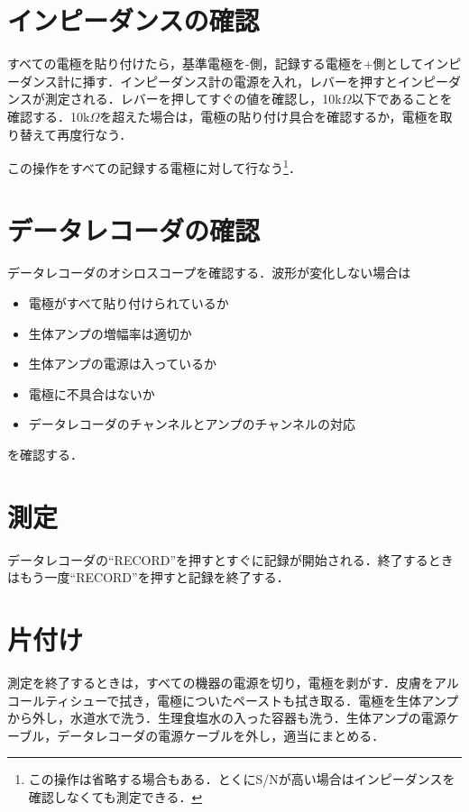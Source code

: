 \documentclass[a4j, twocolumn, openleft, uplatex, dvipdfmx]{jsbook}
\begin{document}
        \section{インピーダンスの確認}
        \label{sec:インピーダンスの確認}

            すべての電極を貼り付けたら，基準電極を-側，記録する電極を+側としてインピーダンス計に挿す．インピーダンス計の電源を入れ，レバーを押すとインピーダンスが測定される．レバーを押してすぐの値を確認し，10k$\Omega$以下であることを確認する．10k$\Omega$を超えた場合は，電極の貼り付け具合を確認するか，電極を取り替えて再度行なう．

            この操作をすべての記録する電極に対して行なう\footnote{この操作は省略する場合もある．とくにS/Nが高い場合はインピーダンスを確認しなくても測定できる．}．

        \section{データレコーダの確認}
        \label{sec:データレコーダの確認}

            データレコーダのオシロスコープを確認する．波形が変化しない場合は
            \begin{itemize}
                \item 電極がすべて貼り付けられているか
                \item 生体アンプの増幅率は適切か
                \item 生体アンプの電源は入っているか
                \item 電極に不具合はないか
                \item データレコーダのチャンネルとアンプのチャンネルの対応
            \end{itemize}
            を確認する．

        \section{測定}
        \label{sec:測定}

            データレコーダの``\textsf{RECORD}''を押すとすぐに記録が開始される．終了するときはもう一度``\textsf{RECORD}''を押すと記録を終了する．

        \section{片付け}
        \label{sec:片付け}

        測定を終了するときは，すべての機器の電源を切り，電極を剥がす．皮膚をアルコールティシューで拭き，電極についたペーストも拭き取る．電極を生体アンプから外し，水道水で洗う．生理食塩水の入った容器も洗う．生体アンプの電源ケーブル，データレコーダの電源ケーブルを外し，適当にまとめる．
\end{document}
